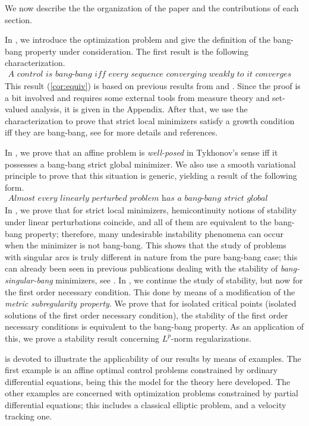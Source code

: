 \documentclass[hidelinks,onefignum,onetabnum]{siamart220329}
\begin{document}
We now describe the the organization of the paper and the contributions of each section.

In , we introduce the optimization problem and give the definition of the bang-bang property under consideration. The first result is the following characterization.
\begin{align*}
	\textit{A control is bang-bang iff every  sequence converging weakly to it converges strongly.}
\end{align*}
This result (\cref{cor:equiv}) is based on previous results from  \cite{Casasbang} and \cite{Visin}. Since  the proof is a bit involved and requires some external tools from measure theory and set-valued analysis, it is given in the Appendix. After that, we use the characterization to prove that strict local minimizers satisfy a growth condition iff they are bang-bang, see  for more  details and  references.


In , we prove that an affine problem is \textit{well-posed} in Tykhonov's sense iff it possesses a bang-bang  strict global minimizer.   We also use a smooth variational principle to prove that this situation is generic, yielding a result of the following form.
 \begin{align*}
 	\textit{Almost every linearly perturbed problem has a bang-bang strict global minimizer.}
 \end{align*}
In , we prove that for strict local minimizers, hemicontinuity  notions of stability under linear perturbations  coincide, and  all of them are equivalent to the bang-bang property; therefore, many undesirable  instability phenomena can occur when the minimizer is not bang-bang. This shows that the study of problems with singular arcs is truly different in nature from the pure bang-bang case; this can already been seen in previous publications dealing with the stability of \textit{bang-singular-bang} minimizers, see \cite{Felg2,Felgenhauer}. In , we continue the study of stability, but now  for the first order necessary condition. This done by means of a modification of the \textit{metric subregularity property}. We prove that for isolated critical points (isolated solutions of the first order necessary condition), the stability of the first order necessary conditions is equivalent to the bang-bang property. As an application of this, we prove a stability result concerning $L^p$-norm regularizations.

 is devoted to illustrate the applicability of our results by means of examples. The first example is an affine optimal control problems constrained by ordinary differential equations, being this the model for the theory here developed. The other examples are concerned with optimization problems constrained by partial differential equations; this includes a classical elliptic problem, and a velocity tracking one.
\end{document}

